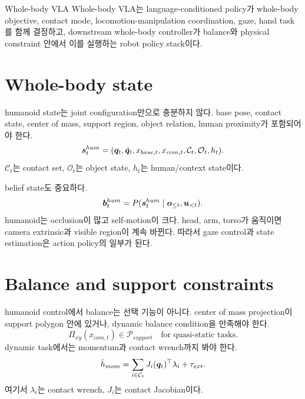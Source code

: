 \begin{definitionbox}{Whole-body VLA}
Whole-body VLA는 language-conditioned policy가 whole-body objective, contact mode, locomotion-manipulation coordination, gaze, hand task를 함께 결정하고, downstream whole-body controller가 balance와 physical constraint 안에서 이를 실행하는 robot policy stack이다.
\end{definitionbox}

\section{Whole-body state}

humanoid state는 joint configuration만으로 충분하지 않다. base pose, contact state, center of mass, support region, object relation, human proximity가 포함되어야 한다.
\begin{equation}
  \bm{s}_t^{hum}
  =
  (
  \bm{q}_t,
  \dot{\bm{q}}_t,
  x_{base,t},
  x_{com,t},
  \mathcal{C}_t,
  \mathcal{O}_t,
  h_t
  ).
  \label{eq:ch20-humanoid-state}
\end{equation}
$\mathcal{C}_t$는 contact set, $\mathcal{O}_t$는 object state, $h_t$는 human/context state이다.

belief state도 중요하다.
\begin{equation}
  \bm{b}_t^{hum}
  =
  P(
  \bm{s}_t^{hum}
  \mid
  \bm{o}_{\leq t},
  \bm{u}_{<t}
  ).
  \label{eq:ch20-humanoid-belief}
\end{equation}
humanoid는 occlusion이 많고 self-motion이 크다. head, arm, torso가 움직이면 camera extrinsic과 visible region이 계속 바뀐다. 따라서 gaze control과 state estimation은 action policy의 일부가 된다.

\section{Balance and support constraints}

humanoid control에서 balance는 선택 기능이 아니다. center of mass projection이 support polygon 안에 있거나, dynamic balance condition을 만족해야 한다.
\begin{equation}
  \Pi_{xy}(x_{com,t})
  \in
  \mathcal{P}_{support}
  \quad
  \text{for quasi-static tasks}.
  \label{eq:ch20-support-polygon}
\end{equation}
dynamic task에서는 momentum과 contact wrench까지 봐야 한다.
\begin{equation}
  \dot{h}_{mom}
  =
  \sum_{i \in \mathcal{C}_t}
  J_i(\bm{q}_t)^{\top} \lambda_i
  +
  \tau_{ext}.
  \label{eq:ch20-momentum}
\end{equation}
여기서 $\lambda_i$는 contact wrench, $J_i$는 contact Jacobian이다.

